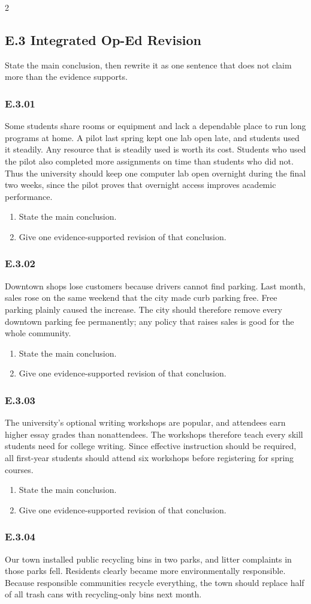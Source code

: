 \documentclass[10pt]{extarticle}
\newcommand{\bankitem}[1]{\subsubsection*{#1}}
\begin{document}
\begin{multicols}{2}
\subsection*{E.3 Integrated Op-Ed Revision}
State the main conclusion, then rewrite it as one sentence that does not claim
more than the evidence supports.
\bankitem{E.3.01}
Some students share rooms or equipment and lack a dependable place to run long programs at home. A pilot last spring kept one lab open late, and students used it steadily. Any resource that is steadily used is worth its cost. Students who used the pilot also completed more assignments on time than students who did not. Thus the university should keep one computer lab open overnight during the final two weeks, since the pilot proves that overnight access improves academic performance.
\begin{enumerate}[label=(\alph*)]
  \item State the main conclusion.
  \item Give one evidence-supported revision of that conclusion.
\end{enumerate}
\bankitem{E.3.02}
Downtown shops lose customers because drivers cannot find parking. Last month, sales rose on the same weekend that the city made curb parking free. Free parking plainly caused the increase. The city should therefore remove every downtown parking fee permanently; any policy that raises sales is good for the whole community.
\begin{enumerate}[label=(\alph*)]
  \item State the main conclusion.
  \item Give one evidence-supported revision of that conclusion.
\end{enumerate}
\bankitem{E.3.03}
The university's optional writing workshops are popular, and attendees earn higher essay grades than nonattendees. The workshops therefore teach every skill students need for college writing. Since effective instruction should be required, all first-year students should attend six workshops before registering for spring courses.
\begin{enumerate}[label=(\alph*)]
  \item State the main conclusion.
  \item Give one evidence-supported revision of that conclusion.
\end{enumerate}
\bankitem{E.3.04}
Our town installed public recycling bins in two parks, and litter complaints in those parks fell. Residents clearly became more environmentally responsible. Because responsible communities recycle everything, the town should replace half of all trash cans with recycling-only bins next month.

\end{multicols}
\end{document}
